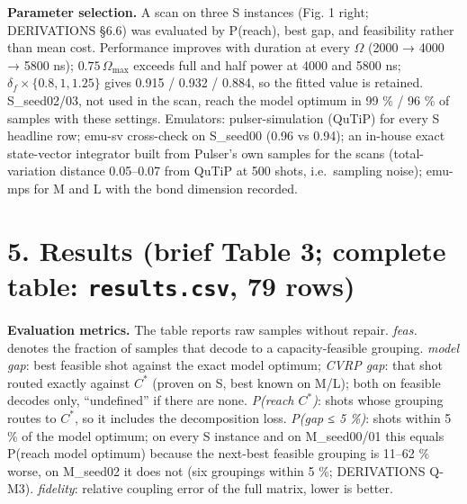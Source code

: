 \documentclass[9pt,a4paper]{extarticle}
\begin{document}
\textbf{Parameter selection.} A scan on three S instances (Fig. 1 right;
DERIVATIONS §6.6) was evaluated by P(reach), best gap, and feasibility
rather than mean cost. Performance improves with duration at every
\(\Omega\) (2000 → 4000 → 5800 ns); \(0.75\,\Omega_{\max}\) exceeds full
and half power at 4000 and 5800 ns; \(\delta_f\times\{0.8,1,1.25\}\)
gives 0.915 / 0.932 / 0.884, so the fitted value is retained.
S\_seed02/03, not used in the scan, reach the model optimum in 99 \% /
96 \% of samples with these settings. Emulators: pulser-simulation
(QuTiP) for every S headline row; emu-sv cross-check on S\_seed00 (0.96
vs 0.94); an in-house exact state-vector integrator built from Pulser's
own samples for the scans (total-variation distance 0.05--0.07 from
QuTiP at 500 shots, i.e.~sampling noise); emu-mps for M and L with the
bond dimension recorded.

\section{\texorpdfstring{5. Results (brief Table 3; complete table:
\texttt{results.csv}, 79
rows)}{5. Results (brief Table 3; complete table: results.csv, 79 rows)}}\label{results-brief-table-3-complete-table-results.csv-79-rows}

\textbf{Evaluation metrics.} The table reports raw samples without
repair. \emph{feas.} denotes the fraction of samples that decode to a
capacity-feasible grouping. \emph{model gap}: best feasible shot against
the exact model optimum; \emph{CVRP gap}: that shot routed exactly
against \(C^*\) (proven on S, best known on M/L); both on feasible
decodes only, ``undefined'' if there are none. \emph{P(reach \(C^*\))}:
shots whose grouping routes to \(C^*\), so it includes the decomposition
loss. \emph{P(gap ≤ 5 \%)}: shots within 5 \% of the model optimum; on
every S instance and on M\_seed00/01 this equals P(reach model optimum)
because the next-best feasible grouping is 11--62 \% worse, on M\_seed02
it does not (six groupings within 5 \%; DERIVATIONS Q-M3).
\emph{fidelity}: relative coupling error of the full matrix, lower is
better.
\end{document}
